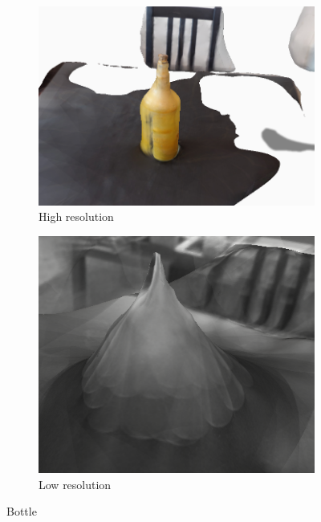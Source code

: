 \begin{figure}
\begin{subfigure}{.5\textwidth}
  \centering
  \includegraphics[width=0.95\linewidth]{images/bottle-high.png}
  \caption{High resolution}
  \label{fig:bottle-high}
\end{subfigure}
\begin{subfigure}{.5\textwidth}
  \centering
  \includegraphics[width=0.8\linewidth]{images/bottle-low.png}
  \caption{Low resolution}
  \label{fig:bottle-low}
\end{subfigure}
\caption{Bottle}
\label{fig:bottle}
\end{figure}

